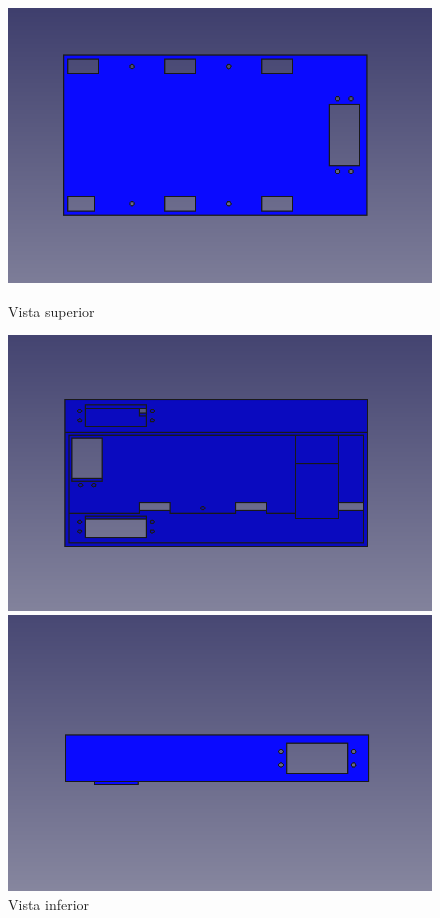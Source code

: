 \begin{figure}[ht!]
	\centering
	\begin{minipage}{0.45\linewidth}
		\centering
		\includegraphics[width=\linewidth]{figs/cap5/basevistasuperiorsin.png}
		\caption*{\centering Vista superior}
	\end{minipage}
	\hspace{1cm}
	\begin{minipage}{0.45\linewidth}
		\centering
		\includegraphics[width=\linewidth]{figs/cap5/basevistaladosin.png}
		\caption*{\centering Vista inferior}
	\end{minipage}
	\hspace{1cm}
	\begin{minipage}{0.45\linewidth}
		\centering
		\includegraphics[width=\linewidth]{figs/cap5/basevistalateralsin.png}

\end{minipage}
\end{figure}
